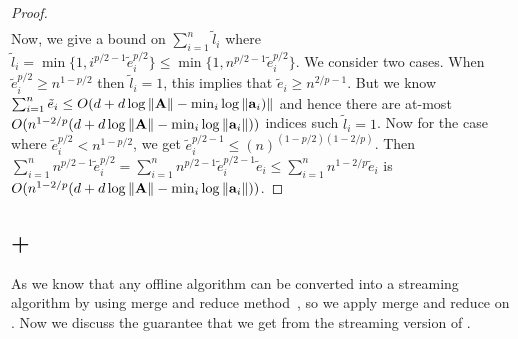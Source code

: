 \begin{proof}{\label{proof:onlineSummationBound}}
\begin{align*}
\end{align*}
Now, we give a bound on $\sum_{i=1}^{n} \tilde{l}_{i}$ where $\tilde{l}_{i} = \min\{1,i^{p/2-1}\tilde{e}_{i}^{p/2}\} \leq \min\{1,n^{p/2-1}\tilde{e}_{i}^{p/2}\}$. We consider two cases. When $\tilde{e}_i^{p/2} \geq n^{1-p/2}$ then $\tilde{l}_{i} = 1$, this implies that $\tilde{e}_i \geq n^{2/p-1}$. But we know $\sum_{i=1}^{n} \tilde{e}_i 
\le O(d+d\log\|\mathbf{A}\|-\min_{i}\log \|\mathbf{a}_{i})\|$ and hence there are at-most $O(n^{1-2/p}(d+d\log\|\mathbf{A}\|-\min_{i}\log \|\mathbf{a}_{i}\|))$ indices such $\tilde{l}_{i} = 1$. Now for the case where $\tilde{e}_{i}^{p/2} < n^{1-p/2}$, we get $\tilde{e}_{i}^{p/2-1} \leq (n)^{(1-p/2)(1-2/p)}$. Then $\sum_{i=1}^{n} n^{p/2-1}\tilde{e}_{i}^{p/2} = \sum_{i=1}^{n} n^{p/2-1}\tilde{e}_{i}^{p/2-1} \tilde{e}_{i} \leq \sum_{i=1}^{n}n^{1-2/p}\tilde{e}_{i}$ is $O(n^{1-2/p}(d+d\log\|\mathbf{A}\|-\min_{i}\log \|\mathbf{a}_{i}\|))$.
\end{proof}
% 
\subsection{\online+\mrlw}
As we know that any offline algorithm can be converted into a streaming algorithm by using merge and reduce method~\cite{har2004coresets}, so we apply merge and reduce on \cite{cohen2015p}. Now we discuss the guarantee that we get from the streaming version of \cite{cohen2015p}.
